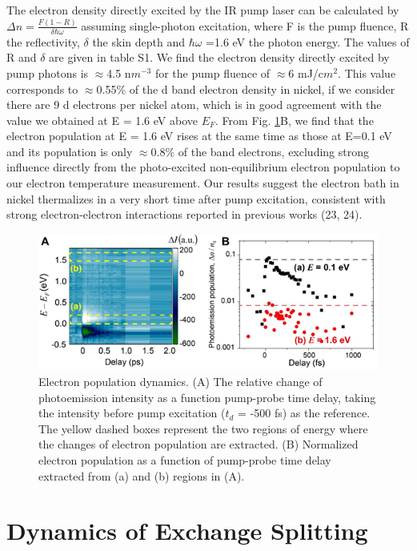The electron density directly excited by the IR pump laser can be calculated by $\Delta n=\frac{F(1-R)}{\delta\hbar\omega}$ assuming single-photon excitation, where F is the pump fluence, R the reflectivity, $\delta$ the skin depth and $\hbar\omega$ =1.6 eV the photon energy. The values of R and $\delta$ are given in table S1. We find the electron density directly excited by pump photons is $\approx$4.5 n$m^{-3}$ for the pump fluence of $\approx$6 mJ/c$m^2$. This value corresponds to $\approx$0.55\% of the d band electron density in nickel, if we consider there are 9 d electrons per nickel atom, which is in good agreement with the value we obtained at E = 1.6 eV above $E_F$. From Fig. \ref{fig: NiSIfig3}B, we find that the electron population at E = 1.6 eV rises at the same time as those at E=0.1 eV and its population is only $\approx$0.8\% of the band electrons, excluding strong influence directly from the photo-excited non-equilibrium electron population to our electron temperature measurement. Our results suggest the electron bath in nickel thermalizes in a very short time after pump excitation, consistent with strong electron-electron interactions reported in previous works (23, 24).

\begin{figure}[htbp]
	\begin{center}
		\includegraphics[width=150mm]{figs/NiFigS3}
	\end{center}
	\caption{Electron population dynamics. (A) The relative change of photoemission intensity as a function pump-probe time delay, taking the intensity before pump excitation ($t_d$ = -500 fs) as the reference. The yellow dashed boxes represent the two regions of energy where the changes of electron population are extracted. (B) Normalized electron population as a function of pump-probe time delay extracted from (a) and (b) regions in (A).}
	\label{fig: NiSIfig3}
\end{figure}

\section{Dynamics of Exchange Splitting}

